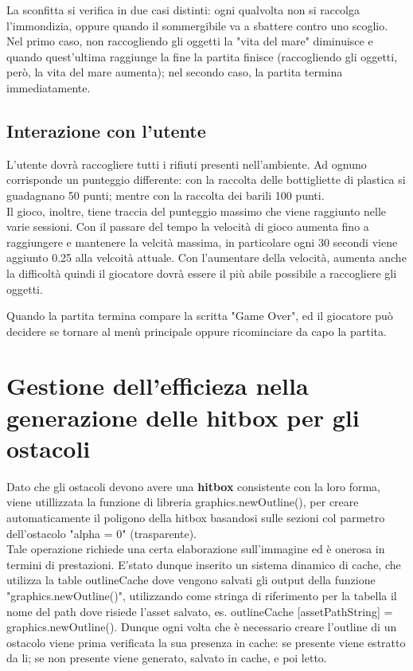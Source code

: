 \documentclass[12pt]{article}
\begin{document}
La sconfitta si verifica in due casi distinti: ogni qualvolta non si raccolga l'immondizia, oppure quando il sommergibile va a sbattere contro uno scoglio. Nel primo caso, non raccogliendo gli oggetti la "vita del mare" diminuisce e quando quest'ultima raggiunge la fine la partita finisce (raccogliendo gli oggetti, però, la vita del mare aumenta); nel secondo caso, la partita termina immediatamente. 
 

\subsection{Interazione con l'utente}
 
L'utente dovrà raccogliere tutti i rifiuti presenti nell'ambiente. Ad ognuno corrisponde un punteggio differente: con la raccolta delle bottigliette di plastica si guadagnano 50 punti; mentre con la raccolta dei barili 100 punti. 
\\Il gioco, inoltre, tiene traccia del punteggio massimo che viene raggiunto nelle varie sessioni.
Con il passare del tempo la velocità di gioco aumenta fino a raggiungere e mantenere la velcità massima, in particolare ogni 30 secondi viene aggiunto 0.25 alla velcoità attuale. Con l'aumentare della velocità, aumenta anche la difficoltà quindi il giocatore dovrà essere il più abile possibile a raccogliere gli oggetti. 


Quando la partita termina compare la scritta "Game Over", ed il giocatore può decidere se tornare al menù principale oppure ricominciare da capo la partita. 

\section{Gestione dell’efficieza nella generazione delle hitbox
per gli ostacoli}

Dato che gli ostacoli devono avere una \textbf{hitbox} consistente con la loro forma, viene utillizzata la funzione di libreria 
graphics.newOutline(), per creare automaticamente il poligono della hitbox basandosi sulle sezioni col parmetro dell'ostacolo "alpha = 0" (trasparente).
\\

Tale operazione richiede una certa elaborazione sull’immagine ed è onerosa in termini di prestazioni. E'stato dunque inserito un sistema 
dinamico di cache, che utilizza la table outlineCache dove vengono salvati gli output della funzione "graphics.newOutline()", utilizzando come stringa di riferimento per la tabella il nome del path dove risiede l’asset salvato, es. outlineCache [assetPathString] = graphics.newOutline().
Dunque ogni volta che è necessario creare l’outline di un ostacolo viene prima verificata la sua presenza in cache: se presente viene 
estratto da li; se non presente viene generato, salvato in cache, e poi letto.
\\
\end{document}
